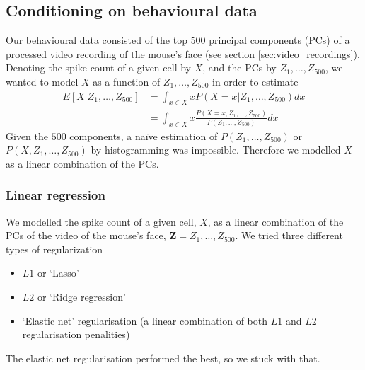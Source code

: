     \subsection{Conditioning on behavioural data}\label{sec:conditioning_on_behavioural_data}
    Our behavioural data consisted of the top $500$ principal components (PCs) of a processed video recording of the mouse's face (see section \ref{sec:video_recordings}). Denoting the spike count of a given cell by $X$, and the PCs by $Z_1,\dots,Z_{500}$, we wanted to model $X$ as a function of $Z_1,\dots,Z_{500}$ in order to estimate
    \begin{align}
      E[X|Z_1,\dots,Z_{500}] &= \int_{x \in X} x P(X=x | Z_1,\dots,Z_{500}) dx \\
        &= \int_{x \in X} x \frac{P(X=x, Z_1,\dots,Z_{500})}{P(Z_1,\dots,Z_{500})} dx
    \end{align}
    Given the $500$ components, a na\"{i}ve estimation of $P(Z_1,\dots,Z_{500})$ or $P(X, Z_1,\dots,Z_{500})$ by histogramming was impossible. Therefore we modelled $X$ as a linear combination of the PCs.

        \subsubsection{Linear regression}
        We modelled the spike count of a given cell, $X$, as a linear combination of the PCs of the video of the mouse's face, $\mathbf{Z} = Z_1,\dots,Z_{500}$. We tried three different types of regularization
        \begin{itemize}
            \item $L1$ or `Lasso'
            \item $L2$ or `Ridge regression'
            \item `Elastic net' regularisation (a linear combination of both $L1$ and $L2$ regularisation penalities)
        \end{itemize}
        The elastic net regularisation performed the best, so we stuck with that.

